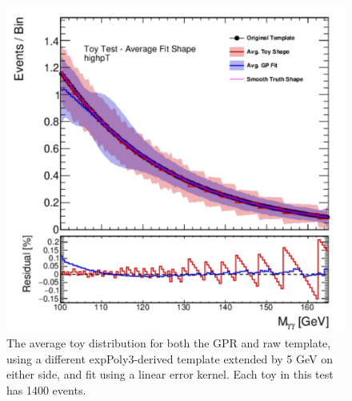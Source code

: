 \begin{figure} 
\begin{center}
  \includegraphics[width=\textwidth]{figures/background/gpr/validation/linear/ToyTest_AvgFitShape_highpT_1400_noSig}   
\caption{The average toy distribution for both the GPR and raw template, using a different expPoly3-derived template extended by 5 GeV on either side, and fit using a linear error kernel. Each toy in this test has 1400 events.}
\label{fig:linearkernel_highpt_1400_noSig}
\end{center}
\end{figure}

